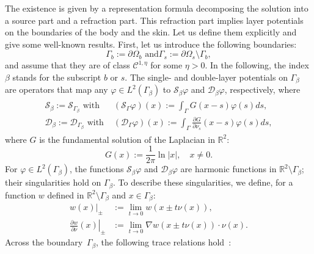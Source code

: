 The existence is given by a representation formula decomposing the
solution into a source part and a refraction part. This refraction
part implies layer potentials on the boundaries of the body and
the skin. Let us define them explicitly and give some well-known
results. First, let us introduce the following boundaries:
\[
\Gamma_{b}:=\partial\Omega_{b}\mbox{ and
}\Gamma_{s}:=\partial\Omega_{s}\setminus\Gamma_{b},
\]
and assume that they are of class $\mathcal{C}^{1,\eta}$ for some
$\eta >0$. In the following, the index $\beta$ stands for the
subscript $b$ or $s$. The single- and double-layer potentials on
$\Gamma_{\beta}$ are operators that map any $\varphi\in
L^{2}(\Gamma_{\beta})$ to $\mathcal{S}_{\beta} \varphi$ and
$\mathcal{D}_{\beta} \varphi$, respectively, where
\begin{equation}
\begin{aligned}\begin{aligned}\mathcal{S}_{\beta} := \mathcal{S}_{\Gamma_\beta} \mbox{ with } &
 (\mathcal{S}_\Gamma \varphi)(x):=\int_{\Gamma}G(x-s)\varphi(s)ds,\\
\mathcal{D}_{\beta} := \mathcal{D}_{\Gamma_\beta} \mbox{ with }  &
(\mathcal{D}_{\Gamma}\varphi)(x)
 :=\int_{\Gamma}\frac{\partial
G}{\partial\nu_{s}}(x-s)\varphi(s)ds,
\end{aligned}
\end{aligned}
\label{eq:def_single_layer}
\end{equation}
 where $G$ is the fundamental solution of the Laplacian in
 $\mathbb{R}^{2}$:
 \begin{equation} \label{defG}
 G(x) := \frac{1}{2\pi} \ln |x|, \quad x \neq 0.
 \end{equation}
For $\varphi\in L^{2}(\Gamma_{\beta})$, the functions
$\mathcal{S}_{\beta}\varphi$ and $\mathcal{D}_{\beta}\varphi$ are
harmonic functions in $\mathbb{R}^{2}\setminus\Gamma_{\beta}$;
their singularities hold on $\Gamma_{\beta}$. To describe these
singularities, we define, for a function $w$ defined in
$\mathbb{R}^{2}\setminus\Gamma_{\beta}$ and $x\in\Gamma_{\beta}$:
\[
\begin{aligned}\left.w(x)\right|_{\pm} & :=\lim_{t\rightarrow0}w(x\pm t\nu(x)),\\
\left.\frac{\partial w}{\partial\nu}(x)\right|_{\pm} & :=\lim_{t\rightarrow0}
 \nabla w(x\pm t\nu(x)) \cdot \nu(x) .
\end{aligned}
\]
 Across the boundary~$\Gamma_{\beta}$, the following  trace relations
hold~\cite{ammari2007polarization}:
